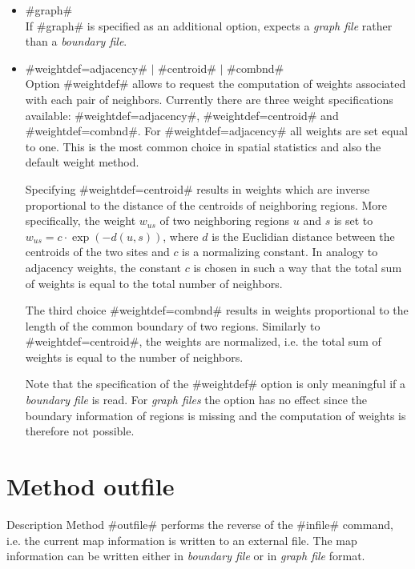 \begin{itemize}
\item #graph# \\
If #graph# is specified as an additional option, \BayesX expects a {\em graph file} rather than a {\em boundary file}.

\item #weightdef=adjacency# $|$ #centroid#  $|$ #combnd# \label{weightsmap}\\
Option #weightdef# allows to request the computation of weights associated with each pair of neighbors. Currently there are three weight specifications available: #weightdef=adjacency#, #weightdef=centroid# and #weightdef=combnd#. For #weightdef=adjacency# all weights are set equal to one. This is the most common choice in spatial statistics and also the default weight method.

Specifying #weightdef=centroid# results in weights which are inverse proportional to the distance of the centroids of
neighboring regions. More specifically, the weight $w_{us}$ of two neighboring regions $u$ and $s$ is set to $w_{us} = c \cdot \exp(-d(u,s))$, where $d$ is the Euclidian distance between the centroids of the two sites and $c$ is a normalizing constant. In analogy to adjacency weights, the constant $c$ is chosen in such a way that the total sum of weights is equal to the total number of neighbors.

The third choice #weightdef=combnd# results in weights proportional to the length of the common boundary of two regions.
Similarly to #weightdef=centroid#, the weights are normalized, i.e. the total sum of weights is equal to the number of neighbors.

Note that the specification of the #weightdef# option is only meaningful if a {\em boundary file} is read. For {\em graph files} the option has no effect since the boundary information of regions is missing and the computation of weights is therefore not possible.
\end{itemize}


\section{Method outfile}
 \label{mapoutfile} 

\begin{stanza}{Description}
Method #outfile# performs the reverse of the #infile# command, i.e. the current map information is written to an external file. The map information can be written either in {\em boundary file} or in {\em graph file} format.
\end{stanza}

